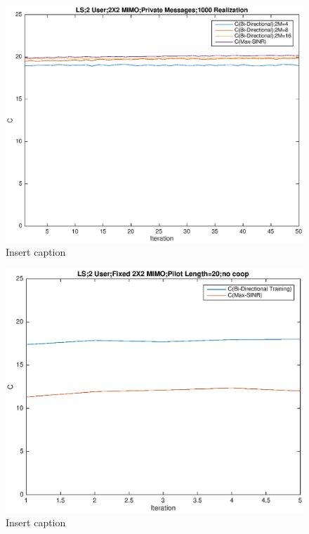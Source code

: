 \documentclass[11pt, oneside]{article}   	%
\begin{document}
\begin{figure}[bp!]
    \centering
    \centerline{\includegraphics[width=220mm]{only_private}}
    \caption{Insert caption}
\end{figure} 

\begin{figure}[bp!]
    \centering
    \centerline{\includegraphics[width=220mm]{no_coop}}
    \caption{Insert caption}
\end{figure} 
\end{document}
